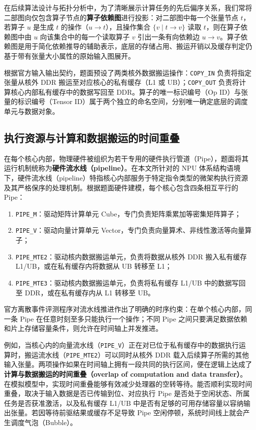 \documentclass[anonymous,notoc]{gmcm2026}
\providecommand{\tightlist}{\setlength{\itemsep}{0pt}\setlength{\parskip}{0pt}}
\begin{document}
在后续算法设计与拓扑分析中，为了清晰展示计算任务的先后偏序关系，我们常将二部图向仅包含算子节点的\textbf{算子依赖图}进行投影：对二部图中每一个张量节点 \(t\)，若算子 \(u\) 是生成 \(t\) 的操作（\(u \to t\)），且操作集合 \(\{v \mid t \to v\}\) 读取 \(t\)，则在算子依赖图中由 \(u\) 向该集合中的每一个读取算子 \(v\) 引出一条有向依赖边 \(u \to v\)。算子依赖图是用于简化依赖推导的辅助表示，底层的存储占用、搬运开销以及缓存判定仍基于带有张量大小属性的原始输入图展开。

根据官方输入输出契约，题面预设了两类核外数据搬运操作：\texttt{COPY\_IN} 负责将指定张量从核外 DDR 搬运至对应核心的私有缓存（L1 或 UB）；\texttt{COPY\_OUT} 负责将计算核心内部私有缓存中的数据写回至 DDR。算子的唯一标识编号（Op ID）与张量的标识编号（Tensor ID）属于两个独立的命名空间，分别唯一确定底层的调度单元与数据对象。

\subsection{执行资源与计算和数据搬运的时间重叠}

在每个核心内部，物理硬件被组织为若干专用的硬件执行管道（Pipe），题面将其运行机制统称为\textbf{硬件流水线（pipeline）}。在本文所针对的 NPU 体系结构语境下，硬件流水线（pipeline）特指核心内部服务于特定指令类型的微架构执行资源及其严格保序的处理机制。根据题面硬件建模，每个核心包含四条相互平行的 Pipe：

\begin{enumerate}
\def\labelenumi{\arabic{enumi}.}
\tightlist
\item
  \texttt{PIPE\_M}：驱动矩阵计算单元 Cube，专门负责矩阵乘累加等密集矩阵算子；
\item
  \texttt{PIPE\_V}：驱动向量计算单元 Vector，专门负责向量算术、非线性激活等向量算子；
\item
  \texttt{PIPE\_MTE2}：驱动核内数据搬运单元，负责将数据从核外 DDR 搬入私有缓存 L1/UB，或在私有缓存内将数据从 UB 转移至 L1；
\item
  \texttt{PIPE\_MTE3}：驱动核内数据搬运单元，负责将私有缓存 L1/UB 中的数据写回至 DDR，或在私有缓存内从 L1 转移至 UB。
\end{enumerate}

官方离散事件评测程序对流水线推进作出了明确的时序约束：在单个核心内部，同一条 Pipe 在任意时刻至多只能执行一个操作；不同 Pipe 之间只要满足数据依赖和片上存储容量条件，则允许在时间轴上并发推进。

例如，当核心内的向量流水线（\texttt{PIPE\_V}）正在对已位于私有缓存中的数据执行运算时，搬运流水线（\texttt{PIPE\_MTE2}）可以同时从核外 DDR 载入后续算子所需的其他输入张量。两项操作如果在时间轴上拥有一段共同的执行区间，便在逻辑上达成了\textbf{计算与数据搬运的时间重叠（overlap of computation and data transfer）}。在模拟模型中，实现时间重叠能够有效减少处理器的空转等待。能否顺利实现时间重叠，取决于输入数据是否已传输到位、对应执行 Pipe 是否处于空闲状态、所属任务是否获准激活，以及私有缓存 L1/UB 中是否有足够的可用存储容量以容纳输出张量。若因等待前驱结果或缓存不足导致 Pipe 空闲停顿，系统时间线上就会产生调度气泡（Bubble）。
\end{document}
